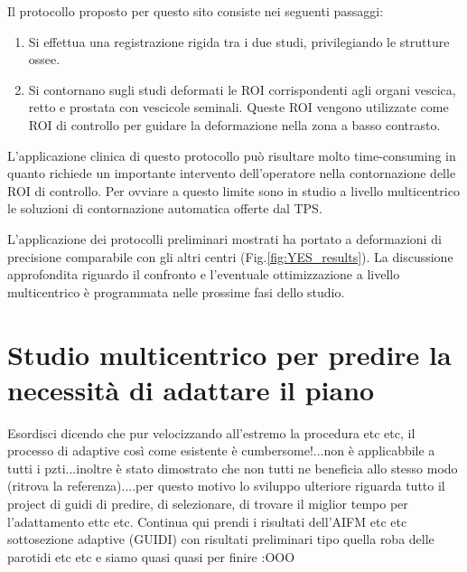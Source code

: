 Il protocollo proposto per questo sito consiste nei seguenti passaggi:
\begin{enumerate}
\item Si effettua una registrazione rigida tra i due studi, privilegiando le strutture ossee.
\item Si contornano sugli studi deformati le ROI corrispondenti agli organi vescica, retto e prostata con vescicole seminali. Queste ROI vengono utilizzate come ROI di controllo per guidare la deformazione nella zona a basso contrasto.
\end{enumerate}
L'applicazione clinica di questo protocollo può risultare molto time-consuming in quanto richiede un importante intervento dell'operatore nella contornazione delle ROI di controllo. Per ovviare a questo limite sono in studio a livello multicentrico le soluzioni di contornazione automatica offerte dal TPS.


L'applicazione dei protocolli preliminari mostrati ha portato a deformazioni di precisione comparabile con gli altri centri (Fig.\ref{fig:YES_results}). La discussione approfondita riguardo il confronto e l'eventuale ottimizzazione a livello multicentrico è programmata nelle prossime fasi dello studio.


\section{Studio multicentrico per predire la necessità di adattare il piano}


Esordisci dicendo che pur velocizzando all'estremo la procedura etc etc, il processo di adaptive così come esistente è cumbersome!...non è applicabbile a tutti i pzti...inoltre è stato dimostrato che non tutti ne beneficia allo stesso modo (ritrova la referenza)....per questo motivo lo sviluppo ulteriore riguarda tutto il project di guidi di predire, di selezionare, di trovare il miglior tempo per l'adattamento ettc etc.
Continua qui prendi i risultati dell'AIFM etc etc
sottosezione adaptive (GUIDI) con risultati preliminari tipo quella roba delle parotidi etc etc e siamo quasi quasi per finire :OOO









